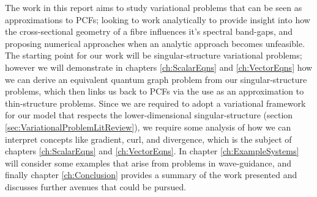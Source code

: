 The work in this report aims to study variational problems that can be seen as approximations to PCFs; looking to work analytically to provide insight into how the cross-sectional geometry of a fibre influences it's spectral band-gaps, and proposing numerical approaches when an analytic approach becomes unfeasible.
The starting point for our work will be singular-structure variational problems; however we will demonstrate in chapters \ref{ch:ScalarEqns} and \ref{ch:VectorEqns} how we can derive an equivalent quantum graph problem from our singular-structure problems, which then links us back to PCFs via the use as an approximation to thin-structure problems.
Since we are required to adopt a variational framework for our model that respects the lower-dimensional singular-structure (section \ref{sec:VariationalProblemLitReview}), we require some analysis of how we can interpret concepts like gradient, curl, and divergence, which is the subject of chapters \ref{ch:ScalarEqns} and \ref{ch:VectorEqns}.
In chapter \ref{ch:ExampleSystems} will consider some examples that arise from problems in wave-guidance, and finally chapter \ref{ch:Conclusion} provides a summary of the work presented and discusses further avenues that could be pursued.